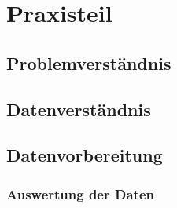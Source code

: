 \section{Praxisteil}

\subsection{Problemverständnis}

\subsection{Datenverständnis}

\subsection{Datenvorbereitung}

\subsubsection{Auswertung der Daten}

\clearpage